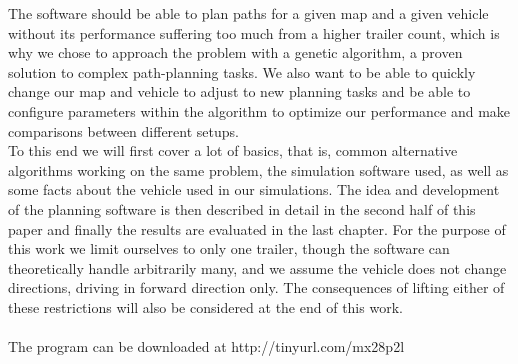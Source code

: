 The software should be able to plan paths for a given map and a given vehicle without its performance suffering too much from a higher trailer count, which is why we chose to approach the problem with a genetic algorithm, a proven \cite{9} solution to complex path-planning tasks. We also want to be able to quickly change our map and vehicle to adjust to new planning tasks and be able to configure parameters within the algorithm to optimize our performance and make comparisons between different setups. \\
To this end we will first cover a lot of basics, that is, common alternative algorithms working on the same problem, the simulation software used, as well as some facts about the vehicle used in our simulations. The idea and development of the planning software is then described in detail in the second half of this paper and finally the results are evaluated in the last chapter. For the purpose of this work we limit ourselves to only one trailer, though the software can theoretically handle arbitrarily many, and we assume the vehicle does not change directions, driving in forward direction only. The consequences of lifting either of these restrictions will also be considered at the end of this work.\\
\\
The program can be downloaded at http://tinyurl.com/mx28p2l